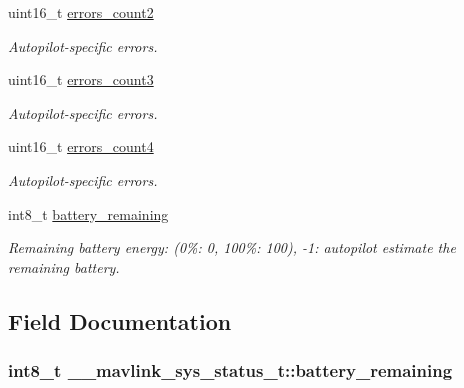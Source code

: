 \begin{DoxyCompactItemize}
uint16\+\_\+t \hyperlink{struct____mavlink__sys__status__t_a5a67792e19997897a415af3b4dba3d68}{errors\+\_\+count2}
\begin{DoxyCompactList}\small\item\em Autopilot-\/specific errors. \end{DoxyCompactList}\item 
uint16\+\_\+t \hyperlink{struct____mavlink__sys__status__t_aafca91f6177e4d0ed71410ac5b8f4ac8}{errors\+\_\+count3}
\begin{DoxyCompactList}\small\item\em Autopilot-\/specific errors. \end{DoxyCompactList}\item 
uint16\+\_\+t \hyperlink{struct____mavlink__sys__status__t_a05303107ce28241b401f6383e6d6e634}{errors\+\_\+count4}
\begin{DoxyCompactList}\small\item\em Autopilot-\/specific errors. \end{DoxyCompactList}\item 
int8\+\_\+t \hyperlink{struct____mavlink__sys__status__t_a89ff7e5cb3d8a698ace5c6653479b71e}{battery\+\_\+remaining}
\begin{DoxyCompactList}\small\item\em Remaining battery energy\+: (0\%\+: 0, 100\%\+: 100), -\/1\+: autopilot estimate the remaining battery. \end{DoxyCompactList}\end{DoxyCompactItemize}


\subsection{Field Documentation}
\hypertarget{struct____mavlink__sys__status__t_a89ff7e5cb3d8a698ace5c6653479b71e}{
\subsubsection[{battery\+\_\+remaining}]{\setlength{\rightskip}{0pt plus 5cm}int8\+\_\+t \+\_\+\+\_\+mavlink\+\_\+sys\+\_\+status\+\_\+t\+::battery\+\_\+remaining}}\label{struct____mavlink__sys__status__t_a89ff7e5cb3d8a698ace5c6653479b71e}


